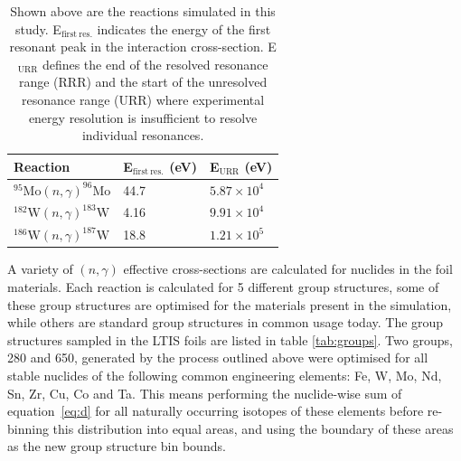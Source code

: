 \begin{table}[H]
  \centering
  \begin{tabu} to \textwidth {X[3] X X}
    \toprule
    Reaction                                       & E$_\mathrm{first\ res.}$ (eV) & E$_\mathrm{URR}$ (eV) \\ 
    \midrule
    $^{95}\mathrm{Mo}(n,\gamma)^{96}\mathrm{Mo}$   & 44.7       & $5.87\times10^{4}$      \\
    $^{182}\mathrm{W}(n,\gamma)^{183}\mathrm{W}$   & 4.16       & $9.91\times10^{4}$      \\
    $^{186}\mathrm{W}(n,\gamma)^{187}\mathrm{W}$   & 18.8       & $1.21\times10^{5}$      \\ 
    \bottomrule
  \end{tabu}
  \caption[Reaction rates calculated as demonstration.]{Shown above are the reactions simulated in this study. E$_\mathrm{first\ res.}$ indicates the energy of the first resonant peak in the interaction cross-section. E$_\mathrm{URR}$ defines the end of the resolved resonance range (RRR) and the start of the unresolved resonance range (URR) where experimental energy resolution is insufficient to resolve individual resonances.}
  \label{tab:reactions}
\end{table}

A variety of $(n,\gamma)$ effective cross-sections are calculated for nuclides in the foil materials. Each reaction is calculated for 5 different group structures, some of these group structures are optimised for the materials present in the simulation, while others are standard group structures in common usage today. The group structures sampled in the LTIS foils are listed in table \ref{tab:groups}. Two groups, 280 and 650, generated by the process outlined above were optimised for all stable nuclides of the following common engineering elements: Fe, W, Mo, Nd, Sn, Zr, Cu, Co and Ta. This means performing the nuclide-wise sum of equation~\ref{eq:d} for all naturally occurring isotopes of these elements before re-binning this distribution into equal areas, and using the boundary of these areas as the new group structure bin bounds.

